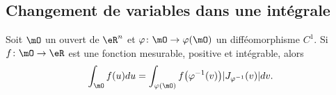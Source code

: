 \subsection{Changement de variables dans une intégrale}

\begin{theorem} \label{ThomFeRCi}
    Soit \( \mO\) un ouvert de \( \eR^n\) et \( \varphi\colon \mO\to \varphi(\mO)\) un difféomorphisme \( C^1\). Si \( f\colon \mO\to \eR\) est une fonction mesurable, positive et intégrable, alors
    \begin{equation}
        \int_{\mO}f(u)du=\int_{\varphi(\mO)}f\big( \varphi^{-1}(v) \big)| J_{\varphi^{-1}}(v) |dv.
    \end{equation}
\end{theorem}
